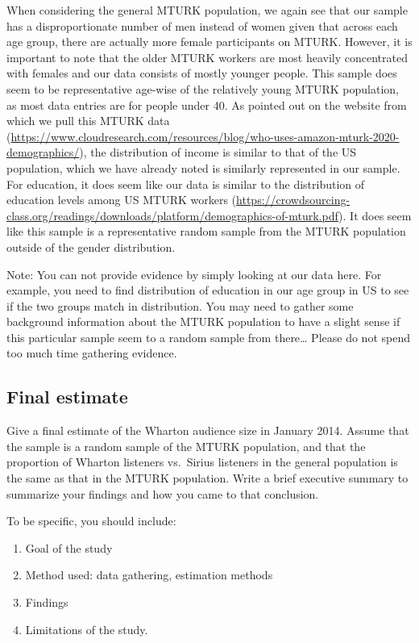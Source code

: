 \documentclass[
]{article}
\providecommand{\tightlist}{%
  \setlength{\itemsep}{0pt}\setlength{\parskip}{0pt}}
\begin{document}
When considering the general MTURK population, we again see that our
sample has a disproportionate number of men instead of women given that
across each age group, there are actually more female participants on
MTURK. However, it is important to note that the older MTURK workers are
most heavily concentrated with females and our data consists of mostly
younger people. This sample does seem to be representative age-wise of
the relatively young MTURK population, as most data entries are for
people under 40. As pointed out on the website from which we pull this
MTURK data
(\url{https://www.cloudresearch.com/resources/blog/who-uses-amazon-mturk-2020-demographics/}),
the distribution of income is similar to that of the US population,
which we have already noted is similarly represented in our sample. For
education, it does seem like our data is similar to the distribution of
education levels among US MTURK workers
(\url{https://crowdsourcing-class.org/readings/downloads/platform/demographics-of-mturk.pdf}).
It does seem like this sample is a representative random sample from the
MTURK population outside of the gender distribution.

Note: You can not provide evidence by simply looking at our data here.
For example, you need to find distribution of education in our age group
in US to see if the two groups match in distribution. You may need to
gather some background information about the MTURK population to have a
slight sense if this particular sample seem to a random sample from
there\ldots{} Please do not spend too much time gathering evidence.

\hypertarget{final-estimate}{%
\subsection{Final estimate}\label{final-estimate}}

Give a final estimate of the Wharton audience size in January 2014.
Assume that the sample is a random sample of the MTURK population, and
that the proportion of Wharton listeners vs.~Sirius listeners in the
general population is the same as that in the MTURK population. Write a
brief executive summary to summarize your findings and how you came to
that conclusion.

To be specific, you should include:

\begin{enumerate}
\def\labelenumi{\arabic{enumi}.}
\tightlist
\item
  Goal of the study
\item
  Method used: data gathering, estimation methods
\item
  Findings
\item
  Limitations of the study.
\end{enumerate}
\end{document}
